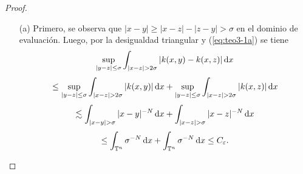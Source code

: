 \begin{proof}
	\begin{itemize}
		\item[(a)] Primero, se observa que $|x-y| \geq |x - z| - |z - y| > \sigma$ en el dominio de evaluación. Luego, por la desigualdad triangular y (\ref{eq:teo3-1a}) se tiene
		\begin{equation*}
			\sup_{|y-z| \leq \sigma} \int_{|x-z| > 2\sigma}|k(x, y) - k(x, z)|\mathop{}\!\mathrm{d} x  
		\end{equation*}
		\begin{equation*}
			\leq \sup_{|y-z| \leq \sigma} \int_{|x-z| > 2\sigma}|k(x, y)|\mathop{}\!\mathrm{d} x + \sup_{|y-z| \leq \sigma} \int_{|x-z| > 2\sigma}|k(x, z)|\mathop{}\!\mathrm{d} x
		\end{equation*}
		\begin{equation*}
			\lesssim  \int_{|x-y|>\sigma} |x-y|^{-N} \diff x + \int_{|x-z|>\sigma} |x-z|^{-N} \diff x
		\end{equation*}
		\begin{equation*}
			\leq  \int_{\mathbb{T}^n} \sigma^{-N} \mathop{}\!\mathrm{d} x + \int_{\mathbb{T}^n} \sigma^{-N} \mathop{}\!\mathrm{d} x \leq C_\varepsilon.
		\end{equation*}
		

\end{itemize}
\end{proof}
